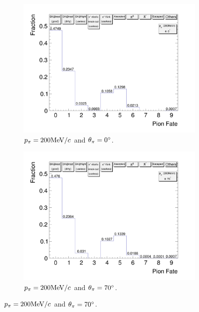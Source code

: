           \begin{figure}[t]
               \centering
               \begin{subfigure}{\dbfigwid\textwidth}
                    \includegraphics[width=\textwidth]{figures/sel/pion_fate_200_0.png}
                    \caption{$p_{\pi}=200\textrm{MeV}/c$ and $\theta_{\pi}=0^\circ$.}
                    \label{subfig:pi-fate-200-0}
               \end{subfigure}
               \begin{subfigure}{\dbfigwid\textwidth}
                    \includegraphics[width=\textwidth]{figures/sel/pion_fate_200_70.png}
                    \caption{$p_{\pi}=200\textrm{MeV}/c$ and $\theta_{\pi}=70^\circ$.}
                    \label{subfig:pi-fate-200-70}

\end{subfigure}
\end{figure}
